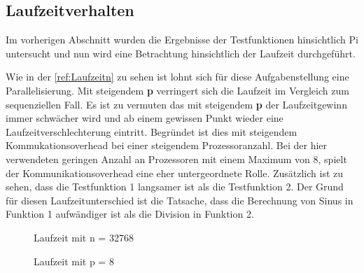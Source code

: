 \subsection{Laufzeitverhalten}
Im vorherigen Abschnitt wurden die Ergebnisse der Testfunktionen hinsichtlich Pi untersucht und nun wird eine Betrachtung hinsichtlich der Laufzeit durchgeführt.

Wie in der \autoref{ref:Laufzeitn} zu sehen ist lohnt sich für diese Aufgabenstellung eine Parallelisierung.
Mit steigendem \textbf{p} verringert sich die Laufzeit im Vergleich zum sequenziellen Fall.
Es ist zu vermuten das mit steigendem \textbf{p} der Laufzeitgewinn immer schwächer wird und ab einem gewissen Punkt wieder eine Laufzeitverschlechterung eintritt.
Begründet ist dies mit steigendem Kommukationsoverhead bei einer steigendem Prozessoranzahl.
Bei der hier verwendeten geringen Anzahl an Prozessoren mit einem Maximum von 8, spielt der Kommunikationsoverhead eine eher untergeordnete Rolle.
Zusätzlich ist zu sehen, dass die Testfunktion 1 langsamer ist als die Testfunktion 2.
Der Grund für diesen Laufzeitunterschied ist die Tatsache, dass die Berechnung von Sinus in Funktion 1 aufwändiger ist als die Division in Funktion 2.
\begin{figure}[h]
\begin{minipage}{0.49\textwidth}
	\caption{Laufzeit mit n = 32768}
	\label{ref:Laufzeitn}
\end{minipage}
\hfill
\begin{minipage}{0.49\textwidth}
	\caption{Laufzeit mit p = 8}
	\label{ref:LaufzeitP}
\end{minipage}
\end{figure}


